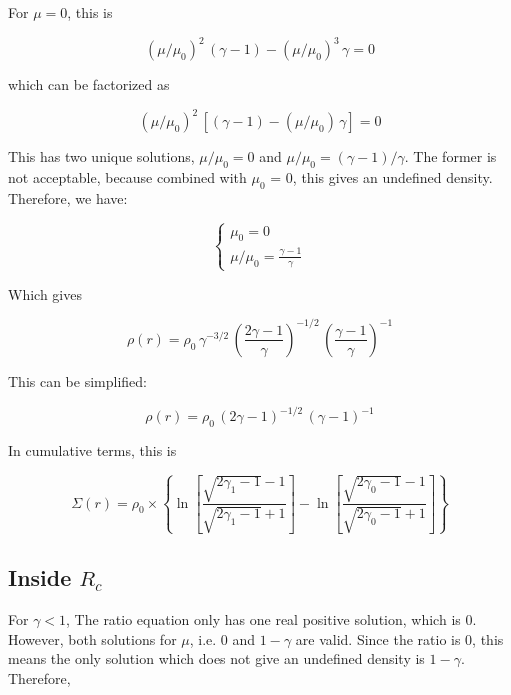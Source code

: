 \documentclass[11pt]{article}
\begin{document}
For $\mu=0$, this is 

\begin{equation}
\left(\mu/\mu_0\right)^2\,(\gamma - 1) - \left(\mu/\mu_0\right)^3\,\gamma = 0
\end{equation}

which can be factorized as

\begin{equation}
\left(\mu/\mu_0\right)^2\,\left[(\gamma - 1) - \left(\mu/\mu_0\right)\,\gamma\right] = 0
\end{equation}

This has two unique solutions, $\mu/\mu_0=0$ and $\mu/\mu_0 = (\gamma - 1)/\gamma$. The former is not acceptable, because combined with $\mu_0$ = 0, this gives an undefined density. Therefore, we have:

\begin{equation}
\left\{\begin{array}{l}\mu_0 = 0 \\\displaystyle\mu/\mu_0 = \frac{\gamma - 1}{\gamma}\end{array}\right.\end{equation}

Which gives

\begin{equation}
\rho(r) = \rho_0\,\gamma^{-3/2}\,\left(\frac{2\gamma-1}{\gamma}\right)^{-1/2} \, \left(\frac{\gamma-1}{\gamma}\right)^{-1}
\end{equation}

This can be simplified:

\begin{equation}
\rho(r) = \rho_0\,(2\gamma-1)^{-1/2} \,(\gamma-1)^{-1}
\end{equation}

In cumulative terms, this is

\begin{equation}
\Sigma(r) = \rho_0 \times \left\{ \ln{\left[\frac{\sqrt{2\gamma_1 - 1} - 1}{\sqrt{2\gamma_1 - 1} + 1}\right]} - \ln{\left[\frac{\sqrt{2\gamma_0 - 1} - 1}{\sqrt{2\gamma_0 - 1} + 1}\right]} \right\}
\end{equation}



\subsection{Inside $R_c$}

For $\gamma < 1$, The ratio equation only has one real positive solution, which is 0. However, both solutions for $\mu$, i.e. 0 and $1-\gamma$ are valid. Since the ratio is 0, this means the only solution which does not give an undefined density is $1-\gamma$. Therefore, 
\end{document}
